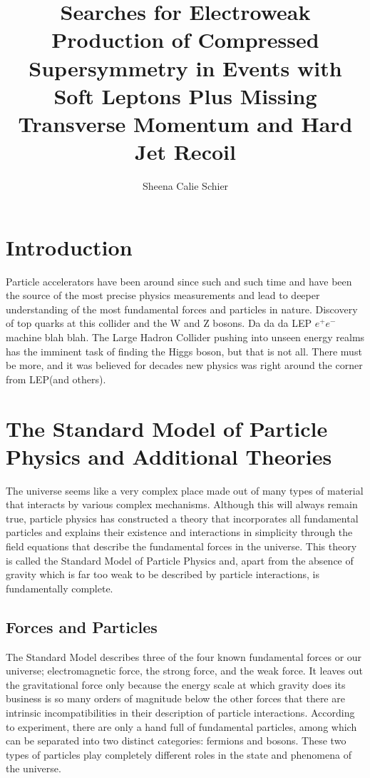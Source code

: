 \documentclass[11pt, oneside]{article}   	%
\title{Searches for Electroweak Production of Compressed Supersymmetry in Events with Soft Leptons Plus Missing Transverse Momentum and Hard Jet Recoil}
\author{Sheena Calie Schier}
\date{}
\begin{document}
\maketitle
\clearpage
\tableofcontents
\clearpage
\section{Introduction}
\label{sec:intro}

Particle accelerators have been around since such and such time and have been the source of the most precise physics measurements and lead to deeper understanding of the most fundamental forces and particles in nature.  Discovery of top quarks at this collider and the W and Z bosons.  Da da da LEP $e^+e^-$ machine blah blah.  The Large Hadron Collider pushing into unseen energy realms has the imminent task of finding the Higgs boson, but that is not all.  There must be more, and it was believed for decades new physics was right around the corner from LEP(and others).  

\clearpage
\section{The Standard Model of Particle Physics and Additional Theories}
\label{sec:theory}
The universe seems like a very complex place made out of many types of material that interacts by various complex mechanisms.  Although this will always remain true, particle physics has constructed a theory that incorporates all fundamental particles and explains their existence and interactions in simplicity through the field equations that describe the fundamental forces in the universe.  This theory is called the Standard Model of Particle Physics and, apart from the absence of gravity which is far too weak to be described by particle interactions, is fundamentally complete.

\subsection{Forces and Particles}
\label{sec:theory1}
The Standard Model describes three of the four known fundamental forces or our universe; electromagnetic force, the strong force, and the weak force.  It leaves out the gravitational force only because the energy scale at which gravity does its business is so many orders of magnitude below the other forces that there are intrinsic incompatibilities in their description of particle interactions.  According to experiment, there are only a hand full of fundamental particles, among which can be separated into two distinct categories: fermions and bosons.  These two types of particles play completely different roles in the state and phenomena of the universe. \cite{tully}
\end{document}
